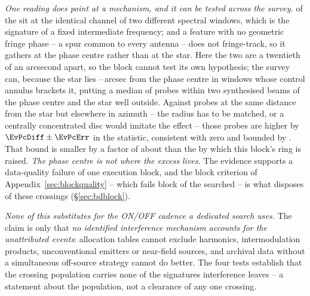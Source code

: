 \emph{One reading does point at a mechanism, and it can be tested across the
survey.} \DqBlockIfMult{} of the \DqBlockNCross{} sit at the identical
channel of two different spectral windows, which is the signature of a fixed
intermediate frequency; and a feature with no geometric fringe phase -- a
spur common to every antenna -- does not fringe-track, so it gathers at the
phase centre rather than at the star. Here the two are a
twentieth of an arcsecond apart, so the block cannot test its own hypothesis;
the survey can, because the star lies \EvPcOffLo--\EvPcOffHi\,arcsec from the
phase centre in \EvPcNWin{} windows whose control annulus brackets it,
putting a median of \EvPcNNear{} probes within two synthesised beams of the
phase centre and the star well outside. Against probes at the same distance
from the star but elsewhere in azimuth -- the radius has to be matched, or a
centrally concentrated disc would imitate the effect -- those probes are
higher by $\EvPcDiff\pm\EvPcErr$ in the statistic, consistent with zero and
bounded by \EvPcBound. That bound is smaller by a factor of about
\EvPcFactor{} than the \EvPcNeed{} by which this block's ring is raised.
\emph{The phase centre is
not where the excess lives.} The evidence supports a data-quality failure of
one execution block, and the block criterion of
Appendix~\ref{sec:blockquality} -- which fails \BqNFail{} block of the
\BqNBlocks{} searched -- is what disposes of these \EvNCrossFlag{} crossings
(\S\ref{sec:bdblock}).

\emph{None of this substitutes for the ON/OFF cadence a dedicated search
uses.} The claim is only that \emph{no
identified interference mechanism accounts for the unattributed events}:
allocation tables cannot exclude harmonics, intermodulation products,
unconventional emitters or near-field sources, and archival data without a
simultaneous off-source strategy cannot do better. The four tests establish
that the crossing population carries none of the signatures interference
leaves -- a statement about the population, not a clearance of any one
crossing.

